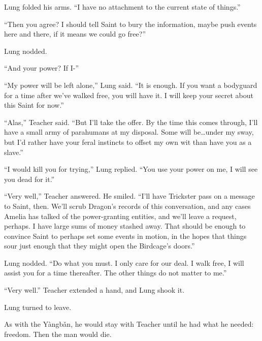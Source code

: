 Lung folded his arms.  ``I have no attachment to the current state of things.''



``Then you agree?  I should tell Saint to bury the information, maybe push events here and there, if it means we could go free?''



Lung nodded.



``And your power?  If I-''



``My power will be left alone,'' Lung said.  ``It is enough.  If you want a bodyguard for a time after we've walked free, you will have it.  I will keep your secret about this Saint for now.''



``Alas,'' Teacher said.  ``But I'll take the offer.  By the time this comes through, I'll have a small army of parahumans at my disposal.  Some will be\ldots under my sway, but I'd rather have your feral instincts to offset my own wit than have you as a slave.''



``I would kill you for trying,'' Lung replied.  ``You use your power on me, I will see you dead for it.''



``Very well,'' Teacher answered.  He smiled.  ``I'll have Trickster pass on a message to Saint, then.  We'll scrub Dragon's records of this conversation, and any cases Amelia has talked of the power-granting entities, and we'll leave a request, perhaps.  I have large sums of money stashed away.  That should be enough to convince Saint to perhaps set some events in motion, in the hopes that things sour just enough that they might open the Birdcage's doors.''



Lung nodded.  ``Do what you must.  I only care for our deal.  I walk free, I will assist you for a time thereafter.  The other things do not matter to me.''



``Very well.''  Teacher extended a hand, and Lung shook it.



Lung turned to leave.



As with the Y\`{a}ngb\v{a}n, he would stay with Teacher until he had what he needed: freedom.  Then the man would die.



